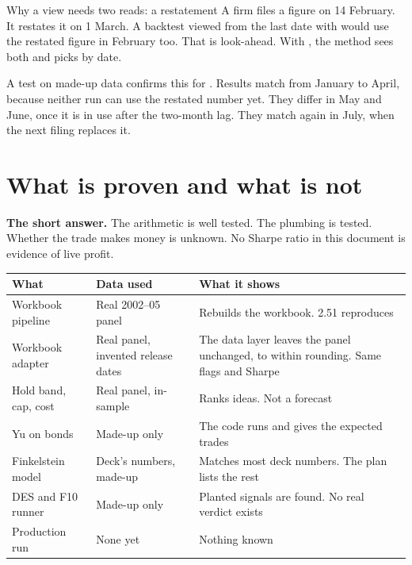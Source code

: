 \documentclass[11pt]{article}
\newcommand{\term}[1]{\textbf{#1}}
\newcommand{\fn}[1]{\texttt{\detokenize{#1}}}
\begin{document}
\begin{examplebox}{Why a view needs two reads: a restatement}
A firm files a figure on 14 February. It restates it on 1 March. A backtest viewed from the last date with \fn{read} would use the restated figure in February too. That is look-ahead. With \fn{versions}, the method sees both and picks by date.

A test on made-up data confirms this for \fn{fk_des}. Results match from January to April, because neither run can use the restated number yet. They differ in May and June, once it is in use after the two-month lag. They match again in July, when the next filing replaces it.
\end{examplebox}

\section{What is proven and what is not}\label{sec:proven}

\begin{plainbox}
\term{The short answer.} The arithmetic is well tested. The plumbing is tested. Whether the trade makes money is unknown. No Sharpe ratio in this document is evidence of live profit.
\end{plainbox}

\begin{center}\small
\begin{tabular}{@{}>{\raggedright\arraybackslash}p{3.9cm}>{\raggedright\arraybackslash}p{3.3cm}>{\raggedright\arraybackslash}p{6.8cm}@{}}\toprule
What & Data used & What it shows\\\midrule
Workbook pipeline & Real 2002--05 panel & Rebuilds the workbook. 2.51 reproduces\\
Workbook adapter & Real panel, invented release dates & The data layer leaves the panel unchanged, to within rounding. Same flags and Sharpe\\
Hold band, cap, cost & Real panel, in-sample & Ranks ideas. Not a forecast\\
Yu on bonds & Made-up only & The code runs and gives the expected trades\\
Finkelstein model & Deck's numbers, made-up & Matches most deck numbers. The plan lists the rest\\
DES and F10 runner & Made-up only & Planted signals are found. No real verdict exists\\
Production run & None yet & Nothing known\\\bottomrule
\end{tabular}
\end{center}
\end{document}
